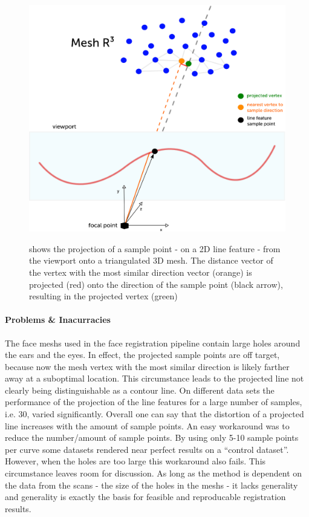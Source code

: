 \begin{figure}[h!]
    \includegraphics[width=\textwidth]{./resources/figures/projection.eps}
\label{fig:projectio}
\caption{shows the projection of a sample point - on a 2D line feature - from the viewport onto a triangulated 3D mesh. The distance vector of the vertex with the most similar direction vector (orange) is projected (red) onto the direction of the sample point (black arrow), resulting in the projected vertex (green)}
\end{figure}
\paragraph{Problems \& Inacurracies}
The face meshs used in the face registration pipeline contain large holes around the ears and the eyes. In effect, the projected sample points are off target, because now the mesh vertex with the most similar direction is likely farther away at a suboptimal location. This circumstance leads to the projected line not clearly being distinguishable as a contour line. On different data sets the performance of the projection of the line features for a large number of
samples, i.e. 30, varied significantly. Overall one can say that the distortion of a projected line increases with the amount of sample points.
An easy workaround was to reduce the number/amount of sample points. By using only 5-10 sample points per curve some datasets rendered near perfect results on a ``control dataset''.  
However, when the holes are too large this workaround also fails. This circumstance leaves room for discussion. As long as the method is dependent on the data from the scans - the size of the holes in the meshs - it lacks generality and generality is exactly the basis for feasible and reproducable registration results.\\

